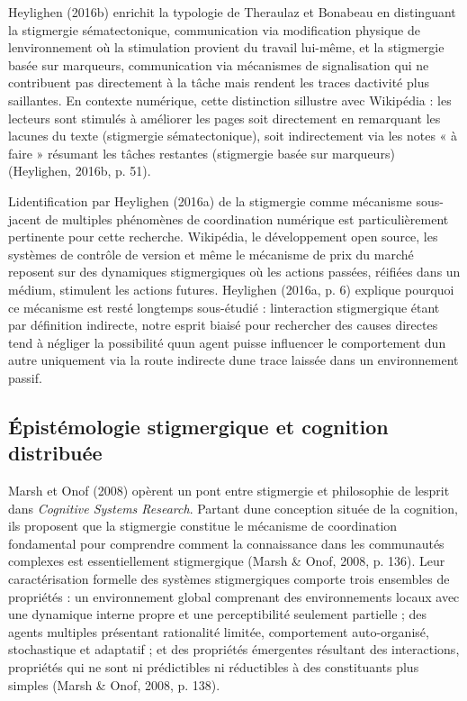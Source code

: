 \documentclass[12pt,a4paper]{article}
\begin{document}
Heylighen (2016b) enrichit la typologie de Theraulaz et Bonabeau en
distinguant la stigmergie sématectonique, communication via modification
physique de l\textquotesingle environnement où la stimulation provient
du travail lui-même, et la stigmergie basée sur marqueurs, communication
via mécanismes de signalisation qui ne contribuent pas directement à la
tâche mais rendent les traces d\textquotesingle activité plus
saillantes. En contexte numérique, cette distinction
s\textquotesingle illustre avec Wikipédia : les lecteurs sont stimulés à
améliorer les pages soit directement en remarquant les lacunes du texte
(stigmergie sématectonique), soit indirectement via les notes « à faire
» résumant les tâches restantes (stigmergie basée sur marqueurs)
(Heylighen, 2016b, p. 51).

L\textquotesingle identification par Heylighen (2016a) de la stigmergie
comme mécanisme sous-jacent de multiples phénomènes de coordination
numérique est particulièrement pertinente pour cette recherche.
Wikipédia, le développement open source, les systèmes de contrôle de
version et même le mécanisme de prix du marché reposent sur des
dynamiques stigmergiques où les actions passées, réifiées dans un
médium, stimulent les actions futures. Heylighen (2016a, p. 6) explique
pourquoi ce mécanisme est resté longtemps sous-étudié :
l\textquotesingle interaction stigmergique étant par définition
indirecte, notre esprit biaisé pour rechercher des causes directes tend
à négliger la possibilité qu\textquotesingle un agent puisse influencer
le comportement d\textquotesingle un autre uniquement via la route
indirecte d\textquotesingle une trace laissée dans un environnement
passif.

\subsection{Épistémologie stigmergique et cognition
distribuée}\label{uxe9pistuxe9mologie-stigmergique-et-cognition-distribuuxe9e}

Marsh et Onof (2008) opèrent un pont entre stigmergie et philosophie de
l\textquotesingle esprit dans \emph{Cognitive Systems Research}. Partant
d\textquotesingle une conception située de la cognition, ils proposent
que la stigmergie constitue le mécanisme de coordination fondamental
pour comprendre comment la connaissance dans les communautés complexes
est essentiellement stigmergique (Marsh \& Onof, 2008, p. 136). Leur
caractérisation formelle des systèmes stigmergiques comporte trois
ensembles de propriétés : un environnement global comprenant des
environnements locaux avec une dynamique interne propre et une
perceptibilité seulement partielle ; des agents multiples présentant
rationalité limitée, comportement auto-organisé, stochastique et
adaptatif ; et des propriétés émergentes résultant des interactions,
propriétés qui ne sont ni prédictibles ni réductibles à des constituants
plus simples (Marsh \& Onof, 2008, p. 138).
\end{document}
